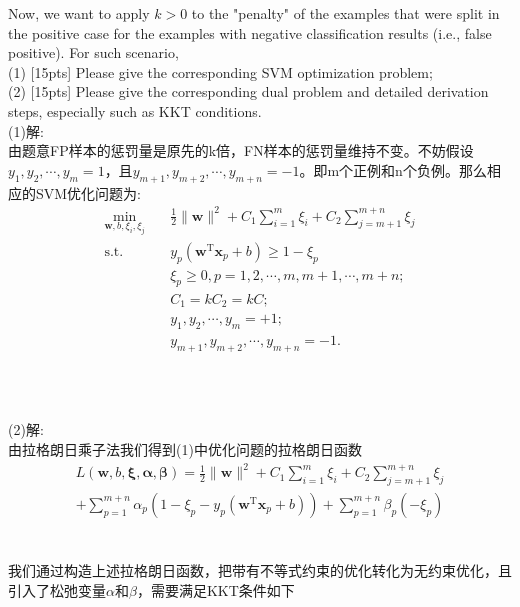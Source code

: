 \documentclass{article}
\begin{document}
    Now, we want to apply $k>0$ to the "penalty" of the examples that were split in the positive case for the examples with negative classification results (i.e., false positive). For such scenario,\\
   (1) [15pts] Please give the corresponding SVM optimization problem;\\
   (2) [15pts] Please give the corresponding dual problem and detailed derivation steps, especially such as KKT conditions.
\\(1)解:\\由题意FP样本的惩罚量是原先的k倍，FN样本的惩罚量维持不变。不妨假设$y_1,y_2,\cdots,y_m=1$，且$y_{m+1},y_{m+2},\cdots,y_{m+n}=-1$。即m个正例和n个负例。那么相应的SVM优化问题为:
\\
    \begin{equation}
    	\label{eq-svm-op}
    	\begin{split}
    		\min_{\mathbf{w},b,\xi_i,\xi_j}& \quad \frac{1}{2} \lVert \mathbf{w} \rVert^2 + C_1\sum_{i=1}^m\xi_i + C_2\sum_{j=m+1}^{m+n}\xi_j\\
    		\text{s.t.}&  \quad y_p(\mathbf{w}^\mathrm{T}\mathbf{x}_p + b)\geq 1-\xi_p\\
    		& \quad \xi_p \geq 0, p = 1,2,\cdots,m,m+1,\cdots,m+n;\\
			& \quad C_1=kC_2=kC;\\
			& \quad y_1,y_2,\cdots,y_m=+1;\\
			& \quad y_{m+1},y_{m+2},\cdots,y_{m+n}=-1.\\
    	\end{split}
    \end{equation}
\\\\\\(2)解:\\	由拉格朗日乘子法我们得到(1)中优化问题的拉格朗日函数\\
\begin{equation}
    	\label{eq-svm-la}
    	\begin{split}
    		L(\bm{w},b,\bm{\xi},\bm{\alpha},\bm{\beta})=\frac{1}{2}\lVert\bm{w}\rVert^2+C_1\sum_{i=1}^m\xi_i + C_2\sum_{j=m+1}^{m+n}\xi_j\\+\sum_{p=1}^{m+n}\alpha_p(1-\xi_p-y_p(\mathbf{w}^\mathrm{T}\mathbf{x}_p + b))+\sum_{p=1}^{m+n}\beta_p(-\xi_p)
    	\end{split}
    \end{equation}
\\\\我们通过构造上述拉格朗日函数，把带有不等式约束的优化转化为无约束优化，且引入了松弛变量$\alpha$和$\beta$，需要满足KKT条件如下\\
\end{document}
